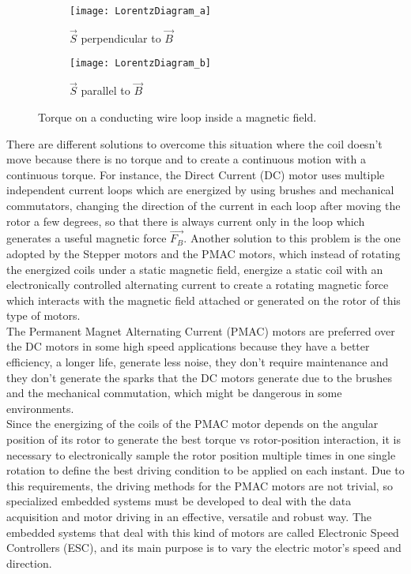 \begin{figure}[H]

\begin{subfigure}{.5\textwidth}
\centering\texttt{[image: LorentzDiagram\_a]} 
\caption{$\overrightarrow{S}$ perpendicular to $\overrightarrow{B}$}
\label{fig:LorentzDiagram_a}
\end{subfigure}
\begin{subfigure}{.5\textwidth}
\centering\texttt{[image: LorentzDiagram\_b]}
\caption{$\overrightarrow{S}$ parallel to $\overrightarrow{B}$}
\label{fig:LorentzDiagram_b}
\end{subfigure}
 
\caption{Torque on a conducting wire loop inside a magnetic field.}
\label{fig:Lorentz_diagrams}
\end{figure}

There are different solutions to overcome this situation where the coil doesn't move because there is no torque and to create a continuous motion with a continuous torque. For instance, the Direct Current (DC) motor uses multiple independent current loops which are energized by using brushes and mechanical commutators, changing the direction of the current in each loop after moving the rotor a few degrees, so that there is always current only in the loop which generates a useful magnetic force $\overrightarrow{F_{B}}$. Another solution to this problem is the one adopted by the Stepper motors and the PMAC motors, which instead of rotating the energized coils under a static magnetic field, energize a static coil with an electronically controlled alternating current to create a rotating magnetic force which interacts with the magnetic field attached or generated on the rotor of this type of motors.\\

The Permanent Magnet Alternating Current (PMAC) motors are preferred over the DC motors in some high speed applications because they have a better efficiency, a longer life, generate less noise, they don't require maintenance and they don't generate the sparks that the DC motors generate due to the brushes and the mechanical commutation, which might be dangerous in some environments. \\

Since the energizing of the coils of the PMAC motor depends on the angular position of its rotor to generate the best torque vs rotor-position interaction, it is necessary to electronically sample the rotor position multiple times in one single rotation to define the best driving condition to be applied on each instant. Due to this requirements, the driving methods for the PMAC motors are not trivial, so specialized embedded systems must be developed to deal with the data acquisition and motor driving in an effective, versatile and robust way. The embedded systems that deal with this kind of motors are called Electronic Speed Controllers (ESC), and its main purpose is to vary the electric motor's speed and direction.\\

